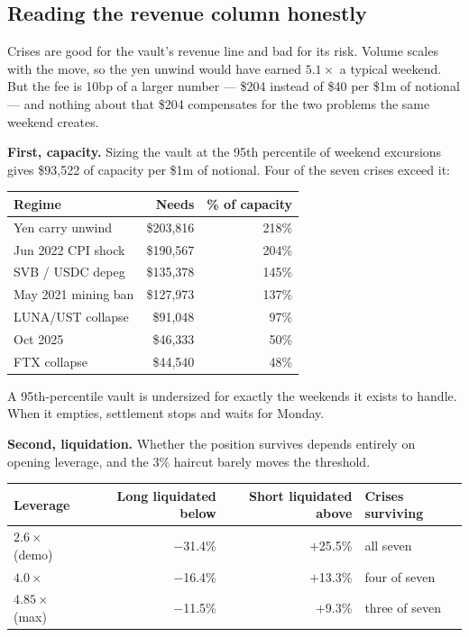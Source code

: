 \documentclass[11pt,a4paper]{article}
\begin{document}
\subsection{Reading the revenue column honestly}

Crises are good for the vault's revenue line and bad for its risk. Volume scales with the
move, so the yen unwind would have earned $5.1\times$ a typical weekend. But the fee is
10bp of a larger number — \$204 instead of \$40 per \$1m of notional — and nothing about
that \$204 compensates for the two problems the same weekend creates.

\textbf{First, capacity.} Sizing the vault at the 95th percentile of weekend excursions
gives \$93{,}522 of capacity per \$1m of notional. Four of the seven crises exceed it:

\begin{center}
\small
\begin{tabular}{@{}lrr@{}}
\toprule
\textbf{Regime} & \textbf{Needs} & \textbf{\% of capacity} \\
\midrule
Yen carry unwind    & \$203{,}816 & 218\% \\
Jun 2022 CPI shock  & \$190{,}567 & 204\% \\
SVB / USDC depeg    & \$135{,}378 & 145\% \\
May 2021 mining ban & \$127{,}973 & 137\% \\
LUNA/UST collapse   & \$91{,}048  & 97\% \\
Oct 2025            & \$46{,}333  & 50\% \\
FTX collapse        & \$44{,}540  & 48\% \\
\bottomrule
\end{tabular}
\end{center}

A 95th-percentile vault is undersized for exactly the weekends it exists to handle. When
it empties, settlement stops and waits for Monday.

\textbf{Second, liquidation.} Whether the position survives depends entirely on opening
leverage, and the 3\% haircut barely moves the threshold.

\begin{center}
\small
\begin{tabular}{@{}lrrl@{}}
\toprule
\textbf{Leverage} & \textbf{Long liquidated below} & \textbf{Short liquidated above} & \textbf{Crises surviving} \\
\midrule
$2.6\times$ (demo) & $-$31.4\% & $+$25.5\% & all seven \\
$4.0\times$        & $-$16.4\% & $+$13.3\% & four of seven \\
$4.85\times$ (max) & $-$11.5\% & $+$9.3\%  & three of seven \\
\bottomrule
\end{tabular}
\end{center}
\end{document}
